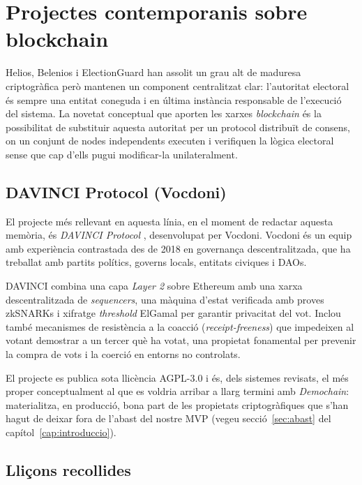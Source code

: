 \section{Projectes contemporanis sobre blockchain}
\label{sec:projectes-blockchain}

Helios, Belenios i ElectionGuard han assolit un grau alt de maduresa
criptogràfica però mantenen un component centralitzat clar:
l'autoritat electoral és sempre una entitat coneguda i en última
instància responsable de l'execució del sistema. La novetat
conceptual que aporten les xarxes \emph{blockchain} és la possibilitat
de substituir aquesta autoritat per un protocol distribuït de consens,
on un conjunt de nodes independents executen i verifiquen la lògica
electoral sense que cap d'ells pugui modificar-la unilateralment.

\subsection{DAVINCI Protocol (Vocdoni)}

El projecte més rellevant en aquesta línia, en el moment de redactar
aquesta memòria, és \emph{DAVINCI Protocol} \cite{vocdoni2026davinci},
desenvolupat per Vocdoni. Vocdoni és un equip amb experiència
contrastada des de 2018 en governança descentralitzada, que ha treballat
amb partits polítics, governs locals, entitats civiques i DAOs.

DAVINCI combina una capa \emph{Layer 2} sobre Ethereum amb una xarxa
descentralitzada de \emph{sequencers}, una màquina d'estat verificada
amb proves \acp{zkSNARK} i xifratge \emph{threshold} ElGamal per
garantir privacitat del vot. Inclou també mecanismes de resistència a
la coacció (\emph{receipt-freeness}) que impedeixen al votant
demostrar a un tercer què ha votat, una propietat fonamental per
prevenir la compra de vots i la coerció en entorns no controlats.

El projecte es publica sota llicència AGPL-3.0 i és, dels sistemes
revisats, el més proper conceptualment al que es voldria arribar a
llarg termini amb \emph{Demochain}: materialitza, en producció, bona
part de les propietats criptogràfiques que s'han hagut de deixar fora
de l'abast del nostre MVP (vegeu secció~\ref{sec:abast} del
capítol~\ref{cap:introduccio}).

\subsection{Lliçons recollides}


